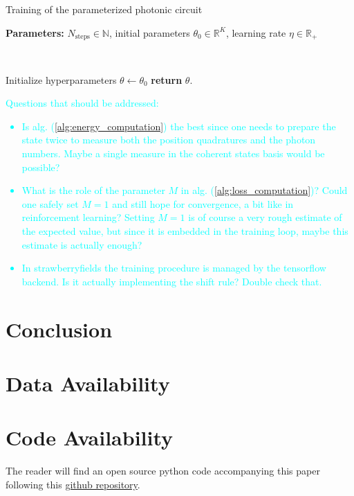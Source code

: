 \documentclass[reprint, amsmath, amssymb, aps]{revtex4-2}
\begin{document}
    \begin{algorithm}
        \caption{Training of the parameterized photonic circuit}\label{alg:training}
        \textbf{Parameters:} $N_\text{steps}\in\mathbb N$, initial parameters $\theta_0\in\mathbb R^K$, learning rate $\eta\in\mathbb R_+$

        \

        Initialize hyperparameters $\theta \gets \theta_0$\;
        \textbf{return} $\theta$.
    \end{algorithm}

    \textcolor{cyan}{
        Questions that should be addressed:
        \begin{itemize}
            \item Is alg. (\ref{alg:energy_computation}) the best since one needs to prepare the state twice to measure both the position quadratures and the photon numbers. Maybe a single measure in the coherent states basis would be possible?
            \item What is the role of the parameter $M$ in alg. (\ref{alg:loss_computation})? Could one safely set $M=1$ and still hope for convergence, a bit like in reinforcement learning? Setting $M=1$ is of course a very rough estimate of the expected value, but since it is embedded in the training loop, maybe this estimate is actually enough?
            \item In strawberryfields the training procedure is managed by the tensorflow backend. Is it actually implementing the shift rule? Double check that.
        \end{itemize}
    }


\section{Conclusion}

\begin{acknowledgments}

\end{acknowledgments}

\section*{Data Availability}

\section*{Code Availability}

The reader will find an open source python code accompanying this paper following this \href{https://github.com/MatthieuSarkis/qdo}{github repository}.

\appendix

\nocite{*}


\end{document}

